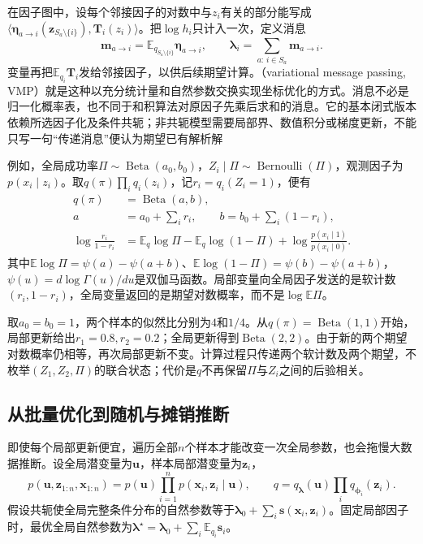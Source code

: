 在因子图中，设每个邻接因子的对数中与$z_i$有关的部分能写成$\langle\bm{\eta}_{a\to i}(\bm z_{S_a\setminus\{i\}}),\bm T_i(z_i)\rangle$。把$\log h_i$只计入一次，定义消息
\[
  \bm m_{a\to i}
    =\mathbb E_{q_{S_a\setminus\{i\}}}\bm{\eta}_{a\to i},
  \qquad
  \bm{\lambda}_i=\sum_{a:\,i\in S_a}\bm m_{a\to i}.
\]
变量再把$\mathbb E_{q_i}\bm T_i$发给邻接因子，以供后续期望计算。（variational message passing, VMP）就是这种以充分统计量和自然参数交换实现坐标优化的方式。消息不必是归一化概率表，也不同于和积算法对原因子先乘后求和的消息。它的基本闭式版本依赖所选因子化及条件共轭；非共轭模型需要局部界、数值积分或梯度更新，不能只写一句“传递消息”便认为期望已有解析解

例如，全局成功率$\Pi\sim\operatorname{Beta}(a_0,b_0)$，$Z_i\mid\Pi\sim\operatorname{Bernoulli}(\Pi)$，观测因子为$p(x_i\mid z_i)$。取$q(\pi)\prod_iq_i(z_i)$，记$r_i=q_i(Z_i=1)$，便有
\begin{equation}
  \begin{aligned}
    q(\pi)&=\operatorname{Beta}(a,b),\\
    a&=a_0+\sum_i r_i,\qquad
    b=b_0+\sum_i(1-r_i),\\
    \log\frac{r_i}{1-r_i}
      &=\mathbb E_q\log\Pi-\mathbb E_q\log(1-\Pi)
         +\log\frac{p(x_i\mid1)}{p(x_i\mid0)}.
  \end{aligned}
  \label{eq:pgm-variational-beta-bernoulli}
\end{equation}
其中$\mathbb E\log\Pi=\psi(a)-\psi(a+b)$、$\mathbb E\log(1-\Pi)=\psi(b)-\psi(a+b)$，$\psi(u)=d\log\Gamma(u)/du$是双伽马函数。局部变量向全局因子发送的是软计数$(r_i,1-r_i)$，全局变量返回的是期望对数概率，而不是$\log\mathbb E\Pi$。

取$a_0=b_0=1$，两个样本的似然比分别为$4$和$1/4$。从$q(\pi)=\operatorname{Beta}(1,1)$开始，局部更新给出$r_1=0.8,r_2=0.2$；全局更新得到$\operatorname{Beta}(2,2)$。由于新的两个期望对数概率仍相等，再次局部更新不变。计算过程只传递两个软计数及两个期望，不枚举$(Z_1,Z_2,\Pi)$的联合状态；代价是$q$不再保留$\Pi$与$Z_i$之间的后验相关。

\subsection{从批量优化到随机与摊销推断}
\label{sec:pgm-variational-stochastic-amortized}
\label{sec:pgm-variational-scalable}
\label{sec:pgm-variational-svi}

即使每个局部更新便宜，遍历全部$n$个样本才能改变一次全局参数，也会拖慢大数据推断。设全局潜变量为$\bm u$，样本局部潜变量为$\bm z_i$，
\[
  p(\bm u,\bm z_{1:n},\bm x_{1:n})
    =p(\bm u)\prod_{i=1}^n p(\bm x_i,\bm z_i\mid\bm u),
  \qquad
  q=q_{\bm{\lambda}}(\bm u)\prod_iq_{\bm{\phi}_i}(\bm z_i).
\]
假设共轭使全局完整条件分布的自然参数等于$\bm{\lambda}_0+\sum_i\bm s(\bm x_i,\bm z_i)$。固定局部因子时，最优全局自然参数为$\bm{\lambda}^\star=\bm{\lambda}_0+\sum_i\mathbb E_{q_i}\bm s_i$。


